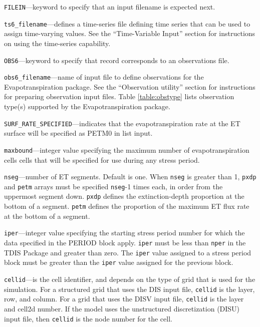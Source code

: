 \item \texttt{FILEIN}---keyword to specify that an input filename is expected next.

\item \texttt{ts6\_filename}---defines a time-series file defining time series that can be used to assign time-varying values. See the ``Time-Variable Input'' section for instructions on using the time-series capability.

\item \texttt{OBS6}---keyword to specify that record corresponds to an observations file.

\item \texttt{obs6\_filename}---name of input file to define observations for the Evapotranspiration package. See the ``Observation utility'' section for instructions for preparing observation input files. Table \ref{table:obstype} lists observation type(s) supported by the Evapotranspiration package.

\item \texttt{SURF\_RATE\_SPECIFIED}---indicates that the evapotranspiration rate at the ET surface will be specified as PETM0 in list input.

\item \texttt{maxbound}---integer value specifying the maximum number of evapotranspiration cells cells that will be specified for use during any stress period.

\item \texttt{nseg}---number of ET segments.  Default is one.  When \texttt{nseg} is greater than 1, \texttt{pxdp} and \texttt{petm} arrays must be specified \texttt{nseg}-1 times each, in order from the uppermost segment down. \texttt{pxdp} defines the extinction-depth proportion at the bottom of a segment. \texttt{petm} defines the proportion of the maximum ET flux rate at the bottom of a segment.

\item \texttt{iper}---integer value specifying the starting stress period number for which the data specified in the PERIOD block apply.  \texttt{iper} must be less than \texttt{nper} in the TDIS Package and greater than zero.  The \texttt{iper} value assigned to a stress period block must be greater than the \texttt{iper} value assigned for the previous block.

\item \texttt{cellid}---is the cell identifier, and depends on the type of grid that is used for the simulation.  For a structured grid that uses the DIS input file, \texttt{cellid} is the layer, row, and column.   For a grid that uses the DISV input file, \texttt{cellid} is the layer and cell2d number.  If the model uses the unstructured discretization (DISU) input file, then \texttt{cellid} is the node number for the cell.

